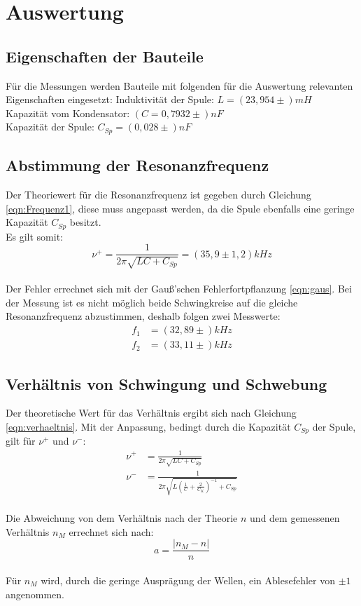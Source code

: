 \newpage
\section{Auswertung}
\label{sec:Auswertung}
\subsection{Eigenschaften der Bauteile}
Für die Messungen werden Bauteile mit folgenden für die Auswertung relevanten Eigenschaften eingesetzt:
Induktivität der Spule: $L=(23,954\pm )mH$\\
Kapazität vom Kondensator: $(C=0,7932\pm )nF$\\
Kapazität der Spule: $C_{Sp}=(0,028\pm )nF$\\
\subsection{Abstimmung der Resonanzfrequenz}
Der Theoriewert für die Resonanzfrequenz ist gegeben durch Gleichung \eqref{eqn:Frequenz1},
diese muss angepasst werden, da die Spule ebenfalls eine geringe Kapazität $C_{Sp}$ besitzt.\\
Es gilt somit:\\
\begin{equation}
  \nu^{+}=\frac{1}{2\pi\sqrt{LC+C_{Sp}}}=(35,9\pm 1,2)kHz
\end{equation}\\
Der Fehler errechnet sich mit der Gauß'schen Fehlerfortpflanzung \eqref{eqn:gaus}.
Bei der Messung ist es nicht möglich beide Schwingkreise auf die gleiche Resonanzfrequenz abzustimmen, deshalb folgen zwei Messwerte:
\begin{align}
f_1&=(32,89 \pm )kHz\\
f_2&=(33,11 \pm )kHz
\end{align}
\subsection{Verhältnis von Schwingung und Schwebung}
Der theoretische Wert für das Verhältnis ergibt sich nach Gleichung \eqref{eqn:verhaeltnis}.
Mit der Anpassung, bedingt durch die Kapazität $C_{Sp}$ der Spule, gilt für $\nu^{+}$ und $\nu^{-}$:
\begin{align}
  \nu^{+}&=\frac{1}{2\pi\sqrt{LC+C_{Sp}}}\label{eqn:angepasst1} \\
  \nu^{-}&=\frac{1}{2\pi\sqrt{L\left(\frac{1}{C}+\frac{2}{C_K}\right)^{-1}+C_{Sp}}}\label{eqn:angepasst2}
\end{align}\\
Die Abweichung von dem Verhältnis nach der Theorie $n$ und dem gemessenen Verhältnis $n_{M}$ errechnet sich nach:\\
\begin{equation}
  a=\frac{\lvert n_{M}-n\rvert}{n}
\end{equation}\\
Für $n_M$ wird, durch die geringe Ausprägung der Wellen, ein Ablesefehler von $\pm 1$ angenommen.\\

